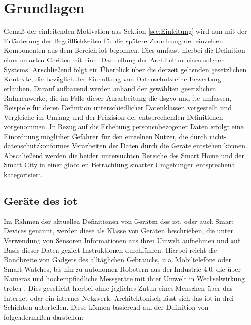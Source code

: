 
\section{Grundlagen}
\label{sec:Grundlagen}

Gemäß der einleitenden Motivation aus Sektion \ref{sec:Einleitung} wird nun mit der Erläuterung der Begrifflichkeiten für die spätere Zuordnung der einzelnen Komponenten aus dem Bereich \ac{iot} begonnen. Dies umfasst hierbei die Definition eines smarten Gerätes mit einer Darstellung der Architektur eines solchen Systems. 
Anschließend folgt ein Überblick über die derzeit geltenden gesetzlichen Kontexte, die bezüglich der Einhaltung von Datenschutz eine Bewertung erlauben. Darauf aufbauend werden anhand der gewählten gesetzlichen Rahmenwerke, die im Falle dieser Ausarbeitung die \ac{dsgvo} und \ac{ftc} umfassen, Beispiele für deren Definition unterschiedlicher Datenklassen vorgestellt und Vergleiche im Umfang und der Präzision der entsprechenden Definitionen vorgenommen. 
In Bezug auf die Erhebung personenbezogener Daten erfolgt eine Einordnung möglicher Gefahren für den einzelnen Nutzer, die durch nicht-datenschutzkonformes Verarbeiten der Daten durch die Geräte entstehen können. 
Abschließend werden die beiden untersuchten Bereiche des Smart Home und der Smart City in einer globalen Betrachtung smarter Umgebungen entsprechend kategorisiert.\\

\subsection{Geräte des \acl{iot}}
\label{sec:Grundlagen:ssec:Geräte des Internet of Things}

Im Rahmen der aktuellen Definitionen von Geräten des \ac{iot}, oder auch Smart Devices genannt, werden diese als Klasse von Geräten beschrieben, die unter Verwendung von Sensoren Informationen aus ihrer Umwelt aufnehmen und auf Basis dieser Daten gezielt Instruktionen durchführen. Hierbei reicht die Bandbreite von Gadgets des alltäglichen Gebrauchs, u.a. Mobiltelefone oder Smart Watches, bis hin zu autonomen Robotern aus der Industrie 4.0, die über Kameras und hochempfindliche Messgeräte mit ihrer Umwelt in Wechselwirkung treten \cite{Li2015}. 
Dies geschieht hierbei ohne jegliches Zutun eines Menschen über das Internet oder ein internes Netzwerk. Architektonisch lässt sich das \ac{iot} in drei Schichten unterteilen. Diese können basierend auf der Definition von \cite{Seliem2018} folgendermaßen darstellen:

